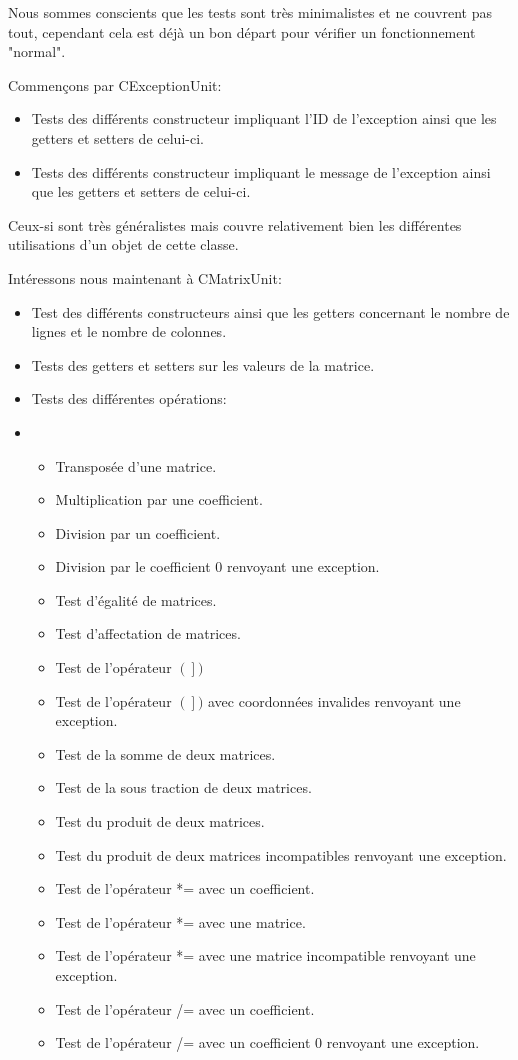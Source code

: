 		Nous sommes conscients que les tests sont très minimalistes et ne couvrent pas tout, cependant cela est déjà un bon départ pour vérifier un fonctionnement "normal".
		
		Commençons par CExceptionUnit:
		\begin{itemize}
			\item Tests des différents constructeur impliquant l'ID de l'exception ainsi que les getters et setters de celui-ci.
			\item Tests des différents constructeur impliquant le message de l'exception ainsi que les getters et setters de celui-ci.
		\end{itemize}
		Ceux-si sont très généralistes mais couvre relativement bien les différentes utilisations d'un objet de cette classe.
		
		Intéressons nous maintenant à CMatrixUnit:
		\begin{itemize}
			\item Test des différents constructeurs ainsi que les getters concernant le nombre de lignes et le nombre de colonnes.
			\item Tests des getters et setters sur les valeurs de la matrice.
			\item Tests des différentes opérations:
			\item 
			\begin{itemize}
				\item Transposée d'une matrice.
				\item Multiplication par une coefficient.
				\item Division par un coefficient.
				\item Division par le coefficient 0 renvoyant une exception.
				\item Test d'égalité de matrices.
				\item Test d'affectation de matrices.
				\item Test de l'opérateur $\left(\right])$
				\item Test de l'opérateur $\left(\right])$ avec coordonnées invalides renvoyant une exception.
				\item Test de la somme de deux matrices.
				\item Test de la sous traction de deux matrices.
				\item Test du produit de deux matrices.
				\item Test du produit de deux matrices incompatibles renvoyant une exception.
				\item Test de l'opérateur *= avec un coefficient.
				\item Test de l'opérateur *= avec une matrice.
				\item Test de l'opérateur *= avec une matrice incompatible renvoyant une exception.
				\item Test de l'opérateur /= avec un coefficient.
				\item Test de l'opérateur /= avec un coefficient 0 renvoyant une exception.
			\end{itemize}
		\end{itemize}
		
